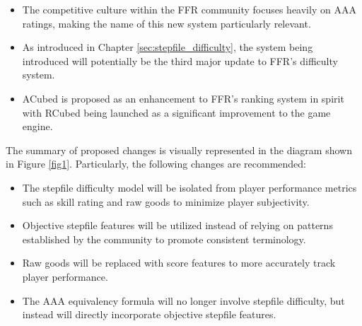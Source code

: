 \begin{itemize}
	\item The competitive culture within the FFR community focuses heavily on AAA ratings, making the name of this new system particularly relevant.
	\item As introduced in Chapter \ref{sec:stepfile_difficulty}, the system being introduced will potentially be the third major update to FFR's difficulty system.
	\item ACubed is proposed as an enhancement to FFR's ranking system in spirit with RCubed being launched as a significant improvement to the game engine.
\end{itemize}

The summary of proposed changes is visually represented in the diagram shown in Figure \ref{fig1}. Particularly, the following changes are recommended:


\begin{itemize}
	\item The stepfile difficulty model will be isolated from player performance metrics such as skill rating and raw goods to minimize player subjectivity.
	\item Objective stepfile features will be utilized instead of relying on patterns established by the community to promote consistent terminology.
	\item Raw goods will be replaced with score features to more accurately track player performance.
	\item The AAA equivalency formula will no longer involve stepfile difficulty, but instead will directly incorporate objective stepfile features.
\end{itemize}



